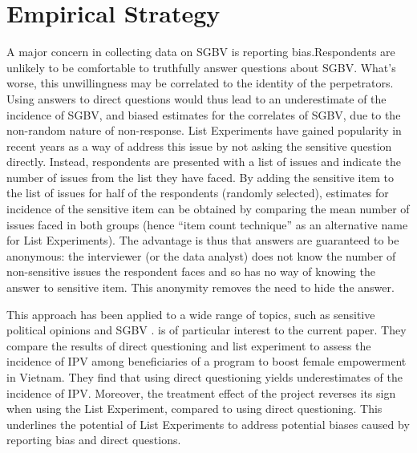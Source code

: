 \documentclass[10pt,a4paper]{scrartcl} %
\begin{document}
\section*{Empirical Strategy}
A major concern in collecting data on SGBV is reporting bias.Respondents are unlikely to be comfortable to truthfully answer questions about SGBV. What's worse, this unwillingness may be correlated to the identity of the perpetrators\citep{Stark2017}. Using answers to direct questions would thus lead to an underestimate of the incidence of SGBV, and biased estimates for the correlates of SGBV, due to the non-random nature of non-response. List Experiments have gained popularity in recent years as a way of address this issue by not asking the sensitive question directly. Instead, respondents are presented with a list of issues and indicate the number of issues from the list they have faced. By adding the sensitive item to the list of issues for half of the respondents (randomly selected), estimates for incidence of the sensitive item can be obtained by comparing the mean number of issues faced in both groups (hence ``item count technique'' as an alternative name for List Experiments). The advantage is thus that answers are guaranteed to be anonymous: the interviewer (or the data analyst) does not know the number of non-sensitive issues the respondent faces and so has no way of knowing the answer to sensitive item. This anonymity removes the need to hide the answer. 


This approach has been applied to a wide range of topics, such as sensitive political opinions \citep{Frye2017,Blair2014,Meng2017} and SGBV \citep{Bulte2019}. \cite{Bulte2019} is of particular interest to the current paper. They compare the results of direct questioning and list experiment to assess the incidence of IPV among beneficiaries of a program to boost female empowerment in Vietnam. They find that using direct questioning yields underestimates of the incidence of IPV. Moreover, the treatment effect of the project reverses its sign when using the List Experiment, compared to using direct questioning. This underlines the potential of List Experiments to address potential biases caused by reporting bias and direct questions.
\end{document}
